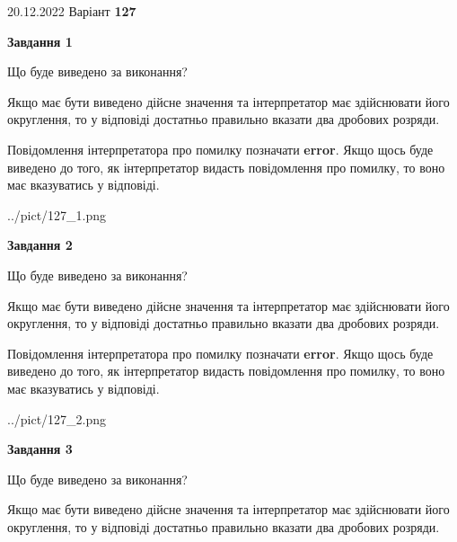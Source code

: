 \documentclass[12pt, ukrainian]{article}
\begin{document}
{20.12.2022 Варіант \No \textbf { 127 }\par}
{
\begin {Large}

{\begin {center}\textbf{Завдання 1}\end {center}}\par
Що буде виведено за виконання? \par

Якщо має бути виведено дійсне значення та інтерпретатор має здійснювати його округлення, 
то у відповіді достатньо правильно вказати два дробових розряди.

Повідомлення інтерпретатора про помилку позначати \textbf{error}.
Якщо щось буде виведено до того, як інтерпретатор видасть повідомлення про помилку, 
то воно має вказуватись у відповіді. \par

\begin{center}
	{../pict/127_1.png}
\end{center}
\newpage

{\begin {center}\textbf{Завдання 2}\end {center}}\par
Що буде виведено за виконання? \par

Якщо має бути виведено дійсне значення та інтерпретатор має здійснювати його округлення, 
то у відповіді достатньо правильно вказати два дробових розряди.

Повідомлення інтерпретатора про помилку позначати \textbf{error}.
Якщо щось буде виведено до того, як інтерпретатор видасть повідомлення про помилку, 
то воно має вказуватись у відповіді. \par

\begin{center}
	{../pict/127_2.png}
\end{center}
\newpage

{\begin {center}\textbf{Завдання 3}\end {center}}\par
Що буде виведено за виконання? \par

Якщо має бути виведено дійсне значення та інтерпретатор має здійснювати його округлення, 
то у відповіді достатньо правильно вказати два дробових розряди.


\end{Large}}
\end{document}
